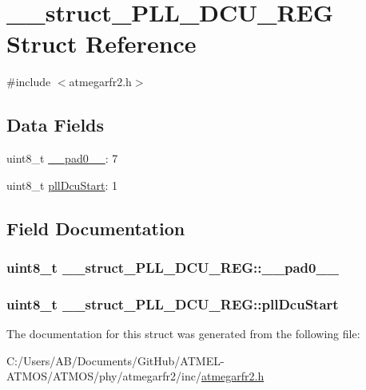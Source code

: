 \hypertarget{struct____struct___p_l_l___d_c_u___r_e_g}{\section{\-\_\-\-\_\-struct\-\_\-\-P\-L\-L\-\_\-\-D\-C\-U\-\_\-\-R\-E\-G Struct Reference}
\label{struct____struct___p_l_l___d_c_u___r_e_g}
}


{\ttfamily \#include $<$atmegarfr2.\-h$>$}

\subsection*{Data Fields}
\begin{DoxyCompactItemize}
\item 
uint8\-\_\-t \hyperlink{struct____struct___p_l_l___d_c_u___r_e_g_aca8b0d76922de48d0021c67c5d89fe52}{\-\_\-\-\_\-pad0\-\_\-\-\_\-}\-: 7
\item 
uint8\-\_\-t \hyperlink{struct____struct___p_l_l___d_c_u___r_e_g_ae95d62788e2b80b284fcb2d1bcc035e7}{pll\-Dcu\-Start}\-: 1
\end{DoxyCompactItemize}


\subsection{Field Documentation}
\hypertarget{struct____struct___p_l_l___d_c_u___r_e_g_aca8b0d76922de48d0021c67c5d89fe52}{
\subsubsection[{\-\_\-\-\_\-pad0\-\_\-\-\_\-}]{\setlength{\rightskip}{0pt plus 5cm}uint8\-\_\-t \-\_\-\-\_\-struct\-\_\-\-P\-L\-L\-\_\-\-D\-C\-U\-\_\-\-R\-E\-G\-::\-\_\-\-\_\-pad0\-\_\-\-\_\-}}\label{struct____struct___p_l_l___d_c_u___r_e_g_aca8b0d76922de48d0021c67c5d89fe52}
\hypertarget{struct____struct___p_l_l___d_c_u___r_e_g_ae95d62788e2b80b284fcb2d1bcc035e7}{
\subsubsection[{pll\-Dcu\-Start}]{\setlength{\rightskip}{0pt plus 5cm}uint8\-\_\-t \-\_\-\-\_\-struct\-\_\-\-P\-L\-L\-\_\-\-D\-C\-U\-\_\-\-R\-E\-G\-::pll\-Dcu\-Start}}\label{struct____struct___p_l_l___d_c_u___r_e_g_ae95d62788e2b80b284fcb2d1bcc035e7}


The documentation for this struct was generated from the following file\-:\begin{DoxyCompactItemize}
\item 
C\-:/\-Users/\-A\-B/\-Documents/\-Git\-Hub/\-A\-T\-M\-E\-L-\/\-A\-T\-M\-O\-S/\-A\-T\-M\-O\-S/phy/atmegarfr2/inc/\hyperlink{atmegarfr2_8h}{atmegarfr2.\-h}\end{DoxyCompactItemize}
